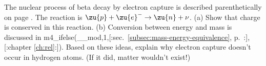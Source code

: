 The nuclear process of beta decay by electron capture
        is described parenthetically on page \pageref{electroncapture}. The reaction is
        $\zu{p}+\zu{e}^- \rightarrow \zu{n}+\nu$.\hwendpart
        (a) Show that charge is conserved in this
        reaction. \hwendpart
        (b) Conversion between energy and mass is
        discussed in m4_ifelse(__mod,1,[:sec.~\ref{subsec:mass-energy-equivalence}, p.~\pageref{subsec:mass-energy-equivalence}:],[:chapter \ref{ch:rel}:]). Based on
        these ideas, explain why electron capture doesn't occur in
        hydrogen atoms. (If it did, matter wouldn't exist!)
